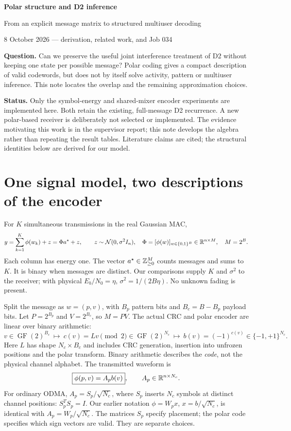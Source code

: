 \documentclass[10pt,a4paper]{article}
\newcommand{\GF}{\operatorname{GF}}
\begin{document}
{\LARGE\bfseries Polar structure and D2 inference}\par
{\large From an explicit message matrix to structured multiuser decoding}\par
{\color{muted}8 October 2026 --- derivation, related work, and Job 034}

\textbf{Question.} Can we preserve the useful joint interference treatment of D2 without keeping one state per
possible message? Polar coding gives a compact description of valid codewords, but does not by itself solve activity,
pattern or multiuser inference. This note locates the overlap and the remaining approximation choices.

\textbf{Status.} Only the symbol-energy and shared-mixer encoder experiments are implemented here. Both retain
the existing, full-message D2 recurrence. A new polar-based receiver is deliberately not selected or implemented.
The evidence motivating this work is in the supervisor report; this note develops the algebra rather than repeating
the result tables. Literature claims are cited; the structural identities below are derived for our model.

\section{One signal model, two descriptions of the encoder}
For $K$ simultaneous transmissions in the real Gaussian MAC,
\begin{equation}
 y=\sum_{k=1}^{K}\phi(w_k)+z=\Phi a^\star+z,
 \qquad z\sim\mathcal N(0,\sigma^2 I_n),\quad
 \Phi=[\phi(w)]_{w\in\{0,1\}^B}\in\mathbb{R}^{n\times M},\quad M=2^B.
\end{equation}
Each column has energy one. The vector $a^\star\in\mathbb{Z}_{\geq0}^M$ counts messages and sums to $K$.
It is binary when messages are distinct. Our comparisons supply $K$ and $\sigma^2$ to the receiver;
with physical $E_b/N_0=\eta$, $\sigma^2=1/(2B\eta)$. No unknown fading is present.

Split the message as $w=(p,v)$, with $B_p$ pattern bits and $B_c=B-B_p$ payload bits. Let
$P=2^{B_p}$ and $V=2^{B_c}$, so $M=PV$. The actual CRC and polar encoder are linear over binary arithmetic:
\begin{equation}
 v\in\GF(2)^{B_c}\ \longmapsto\ c(v)=L v\pmod 2\in\GF(2)^{N_c}
 \ \longmapsto\ b(v)=(-1)^{c(v)}\in\{-1,+1\}^{N_c}.
 \label{eq:polar}
\end{equation}
Here $L$ has shape $N_c\times B_c$ and includes CRC generation, insertion into unfrozen positions and the polar
transform. Binary arithmetic describes the \emph{code}, not the physical channel alphabet. The transmitted waveform is
\begin{equation}
 \boxed{\phi(p,v)=A_p b(v)},\qquad A_p\in\mathbb{R}^{n\times N_c}.
 \label{eq:map}
\end{equation}
For ordinary ODMA, $A_p=S_p/\sqrt{N_c}$, where $S_p$ inserts $N_c$ symbols at distinct channel positions:
$S_p^T S_p=I$. Our earlier notation $\phi=W_p x$, $x=b/\sqrt{N_c}$, is identical with $A_p=W_p/\sqrt{N_c}$.
The matrices $S_p$ specify placement; the polar code specifies which sign vectors are valid. They are separate choices.
\end{document}
